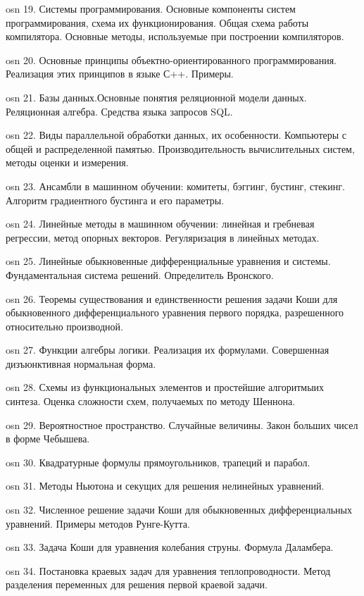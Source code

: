 osn 19. Системы программирования. Основные компоненты систем программирования, схема их функционирования. Общая схема работы компилятора. Основные методы, используемые при построении компиляторов.

osn 20. Основные принципы объектно-ориентированного программирования. Реализация этих принципов в языке С++. Примеры.

osn 21. Базы данных.Основные понятия реляционной модели данных. Реляционная алгебра. Средства языка запросов SQL.

osn 22. Виды параллельной обработки данных, их особенности. Компьютеры с общей и распределенной памятью. Производительность вычислительных систем, методы оценки и измерения.

osn 23. Ансамбли в машинном обучении: комитеты, бэггинг, бустинг, стекинг. Алгоритм градиентного бустинга и его параметры.

osn 24. Линейные методы в машинном обучении: линейная и гребневая регрессии, метод опорных векторов. Регуляризация в линейных методах.

osn 25. Линейные обыкновенные дифференциальные уравнения и системы. Фундаментальная система решений. Определитель Вронского.

osn 26. Теоремы существования и единственности решения задачи Коши для обыкновенного дифференциального уравнения первого порядка, разрешенного относительно производной.

osn 27. Функции алгебры логики. Реализация их формулами. Совершенная дизъюнктивная нормальная форма.

osn 28. Схемы из функциональных элементов и простейшие алгоритмыих синтеза. Оценка сложности схем, получаемых по методу Шеннона.

osn 29. Вероятностное пространство. Случайные величины. Закон больших чисел в форме Чебышева.

osn 30. Квадратурные формулы прямоугольников, трапеций и парабол.

osn 31. Методы Ньютона и секущих для решения нелинейных уравнений.

osn 32. Численное решение задачи Коши для обыкновенных дифференциальных уравнений. Примеры методов Рунге-Кутта.

osn 33. Задача Коши для уравнения колебания струны. Формула Даламбера.

osn 34. Постановка краевых задач для уравнения теплопроводности.  Метод разделения переменных для решения первой краевой задачи.
